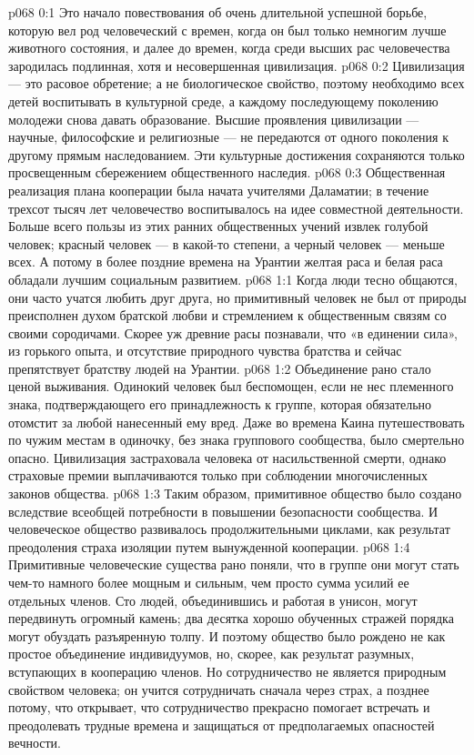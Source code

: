 \author{Мелхиседек}
\vs p068 0:1 Это начало повествования об очень длительной успешной борьбе, которую вел род человеческий с времен, когда он был только немногим лучше животного состояния, и далее до времен, когда среди высших рас человечества зародилась подлинная, хотя и несовершенная цивилизация.
\vs p068 0:2 Цивилизация --- это расовое обретение; а не биологическое свойство, поэтому необходимо всех детей воспитывать в культурной среде, а каждому последующему поколению молодежи снова давать образование. Высшие проявления цивилизации --- научные, философские и религиозные --- не передаются от одного поколения к другому прямым наследованием. Эти культурные достижения сохраняются только просвещенным сбережением общественного наследия.
\vs p068 0:3 Общественная реализация плана кооперации была начата учителями Даламатии; в течение трехсот тысяч лет человечество воспитывалось на идее совместной деятельности. Больше всего пользы из этих ранних общественных учений извлек голубой человек; красный человек --- в какой\hyp{}то степени, а черный человек --- меньше всех. А потому в более поздние времена на Урантии желтая раса и белая раса обладали лучшим социальным развитием.
\vs p068 1:1 Когда люди тесно общаются, они часто учатся любить друг друга, но примитивный человек не был от природы преисполнен духом братской любви и стремлением к общественным связям со своими сородичами. Скорее уж древние расы познавали, что «в единении сила», из горького опыта, и отсутствие природного чувства братства и сейчас препятствует братству людей на Урантии.
\vs p068 1:2 Объединение рано стало ценой выживания. Одинокий человек был беспомощен, если не нес племенного знака, подтверждающего его принадлежность к группе, которая обязательно отомстит за любой нанесенный ему вред. Даже во времена Каина путешествовать по чужим местам в одиночку, без знака группового сообщества, было смертельно опасно. Цивилизация застраховала человека от насильственной смерти, однако страховые премии выплачиваются только при соблюдении многочисленных законов общества.
\vs p068 1:3 Таким образом, примитивное общество было создано вследствие всеобщей потребности в повышении безопасности сообщества. И человеческое общество развивалось продолжительными циклами, как результат преодоления страха изоляции путем вынужденной кооперации.
\vs p068 1:4 \pc Примитивные человеческие существа рано поняли, что в группе они могут стать чем\hyp{}то намного более мощным и сильным, чем просто сумма усилий ее отдельных членов. Сто людей, объединившись и работая в унисон, могут передвинуть огромный камень; два десятка хорошо обученных стражей порядка могут обуздать разъяренную толпу. И поэтому общество было рождено не как простое объединение индивидуумов, но, скорее, как результат  разумных, вступающих в кооперацию членов. Но сотрудничество не является природным свойством человека; он учится сотрудничать сначала через страх, а позднее потому, что открывает, что сотрудничество прекрасно помогает встречать и преодолевать трудные времена и защищаться от предполагаемых опасностей вечности.
